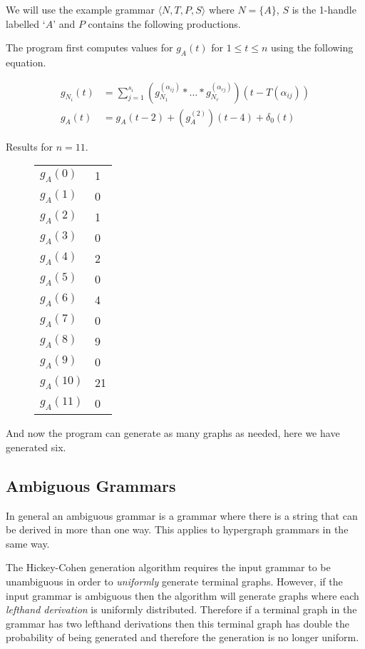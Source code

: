 We will use the example grammar $\langle N, T, P, S \rangle$ where $N = \{A\}$, $S$ is the 1-handle labelled `$A$' and $P$ contains the following productions.


The program first computes values for $g_A(t)$ for $1 \leq t \leq n$ using the following equation.

\begin{align*}
  g_{N_i}(t) &= \sum_{j=1}^{s_i} \left(g_{N_1}^{(\alpha_{ij})} * \hdots * g_{N_r}^{(\alpha_{rj})}\right)(t - T(\alpha_{ij})) \\
  g_A(t) &= g_A(t-2) + (g_A^{(2)})(t-4) + \delta_0(t)
\end{align*}

Results for $n=11$.

\begin{figure}[!h]
\centering
\begin{tabular}{l|l}
$g_A(0)$ & 1 \\
$g_A(1)$ & 0 \\
$g_A(2)$ & 1 \\
$g_A(3)$ & 0 \\
$g_A(4)$ & 2 \\
$g_A(5)$ & 0 \\
$g_A(6)$ & 4 \\
$g_A(7)$ & 0 \\
$g_A(8)$ & 9 \\
$g_A(9)$ & 0 \\
$g_A(10)$ & 21 \\
$g_A(11)$ & 0 \\
\end{tabular}
\end{figure}

And now the program can generate as many graphs as needed, here we have generated six.



\subsection{Ambiguous Grammars}

In general an ambiguous grammar is a grammar where there is a string that can be derived in more than one way. This applies to hypergraph grammars in the same way.

The Hickey-Cohen generation algorithm requires the input grammar to be unambiguous in order to \emph{uniformly} generate terminal graphs. However, if the input grammar is ambiguous then the algorithm will generate graphs where each \emph{lefthand derivation} is uniformly distributed. Therefore if a terminal graph in the grammar has two lefthand derivations then this terminal graph has double the probability of being generated and therefore the generation is no longer uniform.

